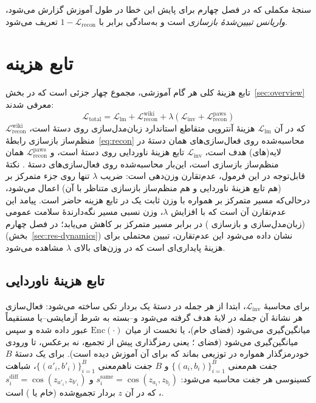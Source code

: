 سنجهٔ مکملی که در فصل چهارم برای پایش این خطا در طول آموزش گزارش می‌شود، \emph{واریانس تبیین‌شدهٔ بازسازی} است و به‌سادگی برابر با
$1-\mathcal{L}_{\mathrm{recon}}$
تعریف می‌شود.

\section{تابع هزینه}
\label{sec:loss}
تابع هزینهٔ کلی هر گام آموزشی، مجموع چهار جزئی است که در بخش~\ref{sec:overview} معرفی شدند:
\begin{equation}
\label{eq:total}
\mathcal{L}_{\mathrm{total}} = \mathcal{L}_{\mathrm{lm}} + \mathcal{L}_{\mathrm{recon}}^{\mathrm{wiki}} + \lambda \left( \mathcal{L}_{\mathrm{inv}} + \mathcal{L}_{\mathrm{recon}}^{\mathrm{paws}} \right)
\end{equation}
که در آن
$\mathcal{L}_{\mathrm{lm}}$
هزینهٔ آنتروپی متقاطع استاندارد زبان‌مدل‌سازی روی دستهٔ
است،
$\mathcal{L}_{\mathrm{recon}}^{\mathrm{wiki}}$
منظم‌ساز بازسازی رابطهٔ~\ref{eq:recon} محاسبه‌شده روی فعال‌سازی‌های همان دستهٔ
در لایه(های) هدف است،
$\mathcal{L}_{\mathrm{inv}}$
تابع هزینهٔ ناوردایی روی دستهٔ
است، و
$\mathcal{L}_{\mathrm{recon}}^{\mathrm{paws}}$
همان منظم‌ساز بازسازی است، این‌بار محاسبه‌شده روی فعال‌سازی‌های دستهٔ
. نکتهٔ قابل‌توجه در این فرمول، عدم‌تقارن وزن‌دهی است: ضریب
$\lambda$
تنها روی جزء متمرکز بر
(هم تابع هزینهٔ ناوردایی و هم منظم‌ساز بازسازی متناظر با آن) اعمال می‌شود، درحالی‌که مسیر متمرکز بر
همواره با وزن ثابت یک در تابع هزینه حاضر است. پیامد این عدم‌تقارن آن است که با افزایش
$\lambda$، وزن نسبی مسیر نگه‌دارندهٔ سلامت عمومی (زبان‌مدل‌سازی و بازسازی
) در برابر مسیر متمرکز بر
کاهش می‌یابد؛ در فصل چهارم (بخش~\ref{sec:res-dynamics}) نشان داده می‌شود این عدم‌تقارن، تبیین محتملی برای هزینهٔ پایداری‌ای است که در وزن‌های بالای
$\lambda$
مشاهده می‌شود.

\subsection{تابع هزینهٔ ناوردایی}
برای محاسبهٔ
$\mathcal{L}_{\mathrm{inv}}$، ابتدا از هر جمله در دستهٔ
یک بردار تکی ساخته می‌شود: فعال‌سازی هر نشانهٔ آن جمله در لایهٔ هدف گرفته می‌شود و--بسته به شرط آزمایشی--یا مستقیماً میانگین‌گیری می‌شود (فضای خام)، یا نخست از میان
$\mathrm{Enc}(\cdot)$
عبور داده شده و سپس میانگین‌گیری می‌شود (فضای
؛ یعنی رمزگذاری پیش از تجمیع، نه برعکس، تا ورودی خودرمزگذار همواره در توزیعی بماند که برای آن آموزش دیده است). برای یک دستهٔ
$B$
جفت هم‌معنی
$\{(a_i, b_i)\}_{i=1}^{B}$
و
$B$
جفت ناهم‌معنی
$\{(a'_i, b'_i)\}_{i=1}^{B}$، شباهت کسینوسی هر جفت محاسبه می‌شود:
$s_i^{\mathrm{same}} = \cos(z_{a_i}, z_{b_i})$
و
$s_i^{\mathrm{diff}} = \cos(z_{a'_i}, z_{b'_i})$، که در آن
$z$
بردار تجمیع‌شده (خام یا
) است.

